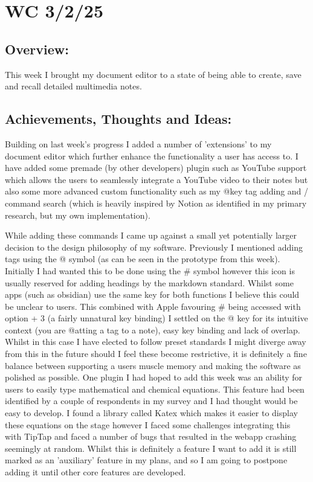 \section{WC 3/2/25}

\subsection*{Overview:}
This week I brought my document editor to a state of being able to create, save and recall detailed multimedia notes.

\subsection*{Achievements, Thoughts and Ideas:}
Building on last week's progress I added a number of 'extensions' to my document editor which further enhance the functionality a user has access to. I have added some premade (by other developers) plugin such as YouTube support which allows the users to seamlessly integrate a YouTube video to their notes but also some more advanced custom functionality such as my @key tag adding and / command search (which is heavily inspired by Notion as identified in my primary research, but my own implementation). 

While adding these commands I came up against a small yet potentially larger decision to the design philosophy of my software. Previously I mentioned adding tags using the @ symbol (as can be seen in the prototype from this week). Initially I had wanted this to be done using the \# symbol however this icon is usually reserved for adding headings by the markdown standard. Whilst some apps (such as obsidian) use the same key for both functions I believe this could be unclear to users. This combined with Apple favouring \# being accessed with option + 3 (a fairly unnatural key binding) I settled on the @ key for its intuitive context (you are @atting a tag to a note), easy key binding and lack of overlap.  Whilst in this case I have elected to follow preset standards I might diverge away from this in the future should I feel these become restrictive, it is definitely a fine balance between supporting a users muscle memory and making the software as polished as possible. One plugin I had hoped to add this week was an ability for users to easily type mathematical and chemical equations. This feature had been identified by a couple of respondents in my survey and I had thought would be easy to develop. I found a library called Katex which makes it easier to display these equations on the stage however I faced some challenges integrating this with TipTap and faced a number of bugs that resulted in the webapp crashing seemingly at random. Whilst this is definitely a feature I want to add it is still marked as an 'auxiliary' feature in my plans, and so I am going to postpone adding it until other core features are developed.

